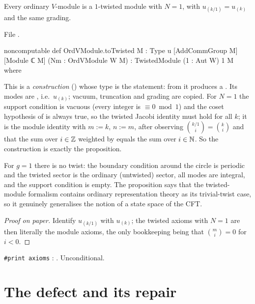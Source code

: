 \begin{proposition}\label{ch06:prop:totwisted}
Every ordinary $V$-module is a $1$-twisted module with $N=1$, with $u_{(k/1)}=u_{(k)}$ and the same
grading.
\end{proposition}
\noindent File .
\begin{leancode}
noncomputable def OrdVModule.toTwisted {M : Type u} [AddCommGroup M] [Module ℂ M]
    (Nm : OrdVModule W M) : TwistedModule (1 : Aut W) 1 M where
\end{leancode}
\begin{dictionary}
This is a \emph{construction} () whose type is the statement: from  it produces
a .  Its modes are , i.e.\
$u_{(k)}$; vacuum, truncation and grading are copied.  For $N=1$ the support condition is vacuous
(every integer is $\equiv 0 \bmod 1$) and the coset hypothesis of \lean{jacobi} is always true, so
the twisted Jacobi identity must hold for all $k$; it is the module identity with $m:=k$,
$n:=m$, after observing $\binom{k/1}{i}=\binom ki$ and that the sum over $i\in{\mathbb{Z}}$ weighted by
\lean{cbz} equals the sum over $i\in{\mathbb{N}}$.  So the construction is exactly the proposition.
\end{dictionary}

\begin{physics}
For $g=1$ there is no twist: the boundary condition around the circle is periodic and the twisted sector is the ordinary (untwisted) sector, all modes are integral, and the support condition is empty. The proposition says that the twisted-module formalism contains ordinary representation theory as its trivial-twist case, so it genuinely generalises the notion of a state space of the CFT.
\end{physics}
\begin{proof}[Proof on paper]
Identify $u_{(k/1)}$ with $u_{(k)}$; the twisted axioms with $N=1$ are then literally the module
axioms, the only bookkeeping being that $\binom{m}{i}=0$ for $i<0$.
\end{proof}
\begin{status}
\texttt{\#print axioms} : .
Unconditional.
\end{status}

\section{The defect and its repair}\label{ch06:sec:repair}

